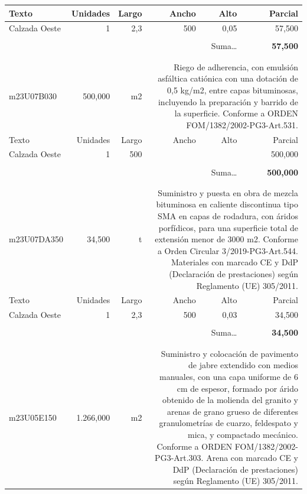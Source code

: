 \documentclass{book}%
\begin{document}
\begin{longtable}{lrrrrr}
Texto&Unidades&Largo&Ancho&Alto&Parcial\\%
\hline%
\multicolumn{1}{p{3.5cm}}{Calzada Oeste}&1&2,3&500&0,05&    57,500\\%
&&&&&\\%
\multicolumn{5}{r}{Suma\ldots}&\textbf{    57,500}\\%
\hline%
&&&&&\\%
&&&&&\\%
m23U07B030&   500,000& m2&\multicolumn{3}{p{6cm}}{\scriptsize Riego de adherencia, con emulsión asfáltica catiónica con una dotación de 0,5 kg/m2, entre capas bituminosas, incluyendo la preparación y barrido de la superficie. Conforme a ORDEN FOM/1382/2002-PG3-Art.531.\normalsize}\\%
Texto&Unidades&Largo&Ancho&Alto&Parcial\\%
\hline%
\multicolumn{1}{p{3.5cm}}{Calzada Oeste}&1&500&&&   500,000\\%
&&&&&\\%
\multicolumn{5}{r}{Suma\ldots}&\textbf{   500,000}\\%
\hline%
&&&&&\\%
&&&&&\\%
m23U07DA350&    34,500& t&\multicolumn{3}{p{6cm}}{\scriptsize Suministro y puesta en obra de mezcla bituminosa en caliente discontinua tipo SMA en capas de rodadura, con áridos porfídicos, para una superficie total de extensión menor de 3000 m2. Conforme a Orden Circular 3/2019-PG3-Art.544. Materiales con marcado CE y DdP (Declaración de prestaciones) según Reglamento (UE) 305/2011.\normalsize}\\%
Texto&Unidades&Largo&Ancho&Alto&Parcial\\%
\hline%
\multicolumn{1}{p{3.5cm}}{Calzada Oeste}&1&2,3&500&0,03&    34,500\\%
&&&&&\\%
\multicolumn{5}{r}{Suma\ldots}&\textbf{    34,500}\\%
\hline%
&&&&&\\%
&&&&&\\%
m23U05E150& 1.266,000& m2&\multicolumn{3}{p{6cm}}{\scriptsize Suministro y colocación de pavimento de jabre extendido con medios manuales, con una capa uniforme de 6 cm de espesor, formado por árido obtenido de la molienda del granito y arenas de grano grueso de diferentes granulometrías de cuarzo, feldespato y mica, y compactado mecánico. Conforme a ORDEN FOM/1382/2002-PG3-Art.303. Arena con marcado CE y DdP (Declaración de prestaciones) según Reglamento (UE) 305/2011.\normalsize}\\%

\end{longtable}
\end{document}
